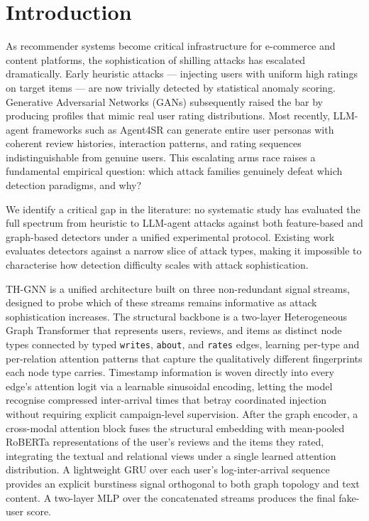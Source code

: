﻿%

\section{Introduction}
\label{sec:intro}

As recommender systems become critical infrastructure for e-commerce and content platforms, the sophistication of shilling attacks has escalated dramatically. Early heuristic attacks — injecting users with uniform high ratings on target items — are now trivially detected by statistical anomaly scoring. Generative Adversarial Networks (GANs) subsequently raised the bar by producing profiles that mimic real user rating distributions. Most recently, LLM-agent frameworks such as Agent4SR can generate entire user personas with coherent review histories, interaction patterns, and rating sequences indistinguishable from genuine users. This escalating arms race raises a fundamental empirical question: which attack families genuinely defeat which detection paradigms, and why?

We identify a critical gap in the literature: no systematic study has evaluated the full spectrum from heuristic to LLM-agent attacks against both feature-based and graph-based detectors under a unified experimental protocol. Existing work evaluates detectors against a narrow slice of attack types, making it impossible to characterise how detection difficulty scales with attack sophistication.

TH-GNN is a unified architecture built on three non-redundant signal streams,
designed to probe which of these streams remains informative as attack
sophistication increases.
The structural backbone is a two-layer Heterogeneous Graph Transformer that
represents users, reviews, and items as distinct node types connected by typed
\texttt{writes}, \texttt{about}, and \texttt{rates} edges, learning per-type and
per-relation attention patterns that capture the qualitatively different
fingerprints each node type carries.
Timestamp information is woven directly into every edge's attention logit via a
learnable sinusoidal encoding, letting the model recognise compressed inter-arrival
times that betray coordinated injection without requiring explicit campaign-level
supervision.
After the graph encoder, a cross-modal attention block fuses the structural
embedding with mean-pooled RoBERTa representations of the user's reviews and the
items they rated, integrating the textual and relational views under a single
learned attention distribution.
A lightweight GRU over each user's log-inter-arrival sequence provides an explicit
burstiness signal orthogonal to both graph topology and text content.
A two-layer MLP over the concatenated streams produces the final fake-user score.

